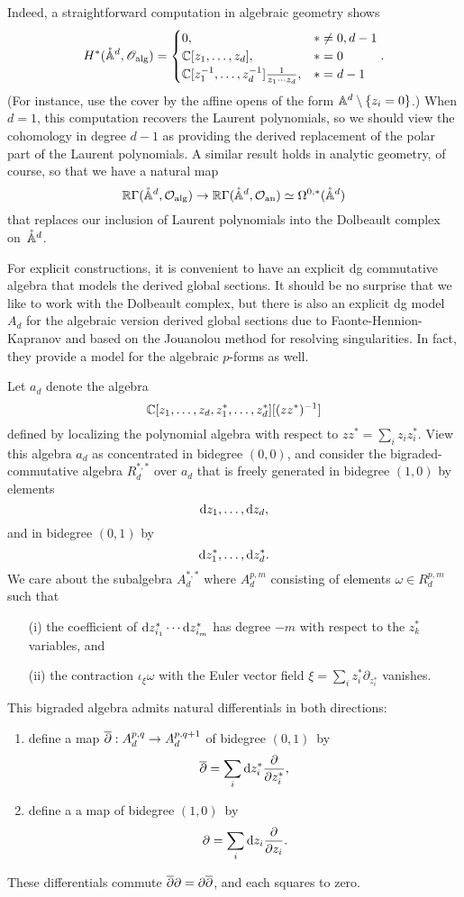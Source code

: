 Indeed, a straightforward computation in algebraic geometry shows
\[
H^*(\pAA^{d}, \sO_{\rm alg}) = 
\begin{cases} 
0, & * \neq 0, d-1 \\ 
\CC[z_1,\ldots,z_d], & * = 0 \\ \CC[z_1^{-1},\ldots,z_d^{-1}] \frac{1}{z_1 \cdots z_d}, & * = d-1 
\end{cases}.
\]
(For instance, use the cover by the affine opens of the form $\AA^d \setminus \{z_i =0\}$.)
When $d=1$, this computation recovers the Laurent polynomials,
so we should view the cohomology in degree $d-1$ as providing the derived replacement of the polar part of the Laurent polynomials.
A similar result holds in analytic geometry, of course,
so that we have a natural map
\[
\RR \Gamma(\pAA^d, \cO_{\rm alg}) \to \RR \Gamma(\pAA^d, \cO_{\rm an}) \simeq \Omega^{0,*}(\pAA^d)
\]
that replaces our inclusion of Laurent polynomials into the Dolbeault complex on~$\pAA^d$.

For explicit constructions, it is convenient to have an explicit dg commutative algebra that models the derived global sections.
It should be no surprise that we like to work with the Dolbeault complex,
but there is also an explicit dg model $A_d$ for the algebraic version derived global sections due to Faonte-Hennion-Kapranov \cite{FHK} and based on the Jouanolou method for resolving singularities. 
In fact, they provide a model for the algebraic $p$-forms as well.

\begin{dfn}
Let $a_d$ denote the algebra  
\[
\CC[z_1,\ldots,z_d, z_1^*,\ldots,z_d^*][(z z^*)^{-1}]
\]
defined by localizing the polynomial algebra with respect to $zz^* = \sum_i z_i z^*_i$.
View this algebra $a_d$ as concentrated in bidegree $(0,0)$, 
and consider the bigraded-commutative algebra $R^{*,*}_d$ over $a_d$ that is freely generated in bidegree $(1,0)$ by elements
\[
\d z_1,\ldots , \d z_d,
\] 
and in bidegree $(0,1)$ by
\[
\d z_1^*,\ldots, \d z_d^*.
\]
We care about the subalgebra $A^{*,*}_d$ where $A^{p,m}_d$ consisting of elements $\omega \in R^{p,m}_d$ such that
\begin{itemize}
\item[(i)] the coefficient of $\d z^*_{i_1} \cdots \d z^*_{i_m}$ has degree $-m$ with respect to the $z_k^*$ variables, and
\item[(ii)] the contraction $\iota_\xi \omega$ with the Euler vector field $\xi = \sum_{i} z_i^* \partial_{z_{i}^*}$ vanishes.
\end{itemize}
This bigraded algebra admits natural differentials in both directions:
\begin{enumerate}
\item define a map $\dbar : A_d^{p,q} \to A_d^{p,q+1}$ of bidegree $(0,1)$~by
\[
\dbar = \sum_i \d z^*_i \frac{\partial}{\partial z_i^*},
\]
\item define a a map of bidegree $(1,0)$~by
\[
\partial = \sum_i \d z_i \frac{\partial}{\partial z_i} .
\]
\end{enumerate}
These differentials commute $\dbar \partial = \partial \dbar$,
and each squares to zero.
\end{dfn}


